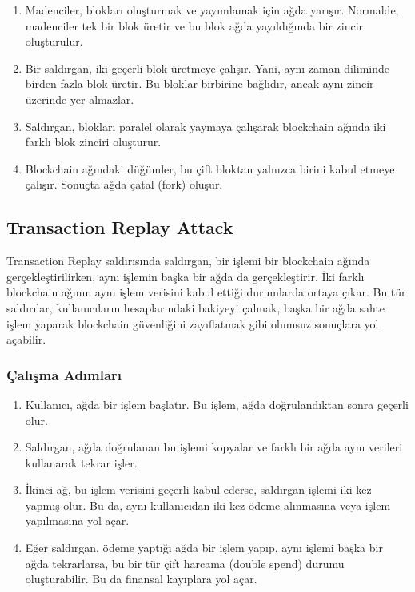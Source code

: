 \begin{enumerate}
    \item Madenciler, blokları oluşturmak ve yayımlamak için ağda yarışır. Normalde, madenciler tek bir blok üretir ve bu blok ağda yayıldığında bir zincir oluşturulur.
    \item Bir saldırgan, iki geçerli blok üretmeye çalışır. Yani, aynı zaman diliminde birden fazla blok üretir. Bu bloklar birbirine bağlıdır, ancak aynı zincir üzerinde yer almazlar.
    \item Saldırgan, blokları paralel olarak yaymaya çalışarak blockchain ağında iki farklı blok zinciri oluşturur.
    \item Blockchain ağındaki düğümler, bu çift bloktan yalnızca birini kabul etmeye çalışır. Sonuçta ağda çatal (fork) oluşur.
\end{enumerate}

\newpage

\subsection{Transaction Replay Attack}

Transaction Replay saldırısında saldırgan, bir işlemi bir blockchain ağında gerçekleştirilirken, aynı işlemin başka bir ağda da gerçekleştirir. İki farklı blockchain ağının aynı işlem verisini kabul ettiği durumlarda ortaya çıkar. Bu tür saldırılar, kullanıcıların hesaplarındaki bakiyeyi çalmak, başka bir ağda sahte işlem yaparak blockchain güvenliğini zayıflatmak gibi olumsuz sonuçlara yol açabilir.

\subsubsection{Çalışma Adımları}

\begin{enumerate}
    \item Kullanıcı, ağda bir işlem başlatır. Bu işlem, ağda doğrulandıktan sonra geçerli olur.
    \item Saldırgan, ağda doğrulanan bu işlemi kopyalar ve farklı bir ağda aynı verileri kullanarak tekrar işler.
    \item İkinci ağ, bu işlem verisini geçerli kabul ederse, saldırgan işlemi iki kez yapmış olur. Bu da, aynı kullanıcıdan iki kez ödeme alınmasına veya işlem yapılmasına yol açar.
    \item Eğer saldırgan, ödeme yaptığı ağda bir işlem yapıp, aynı işlemi başka bir ağda tekrarlarsa, bu bir tür çift harcama (double spend) durumu oluşturabilir. Bu da finansal kayıplara yol açar.
\end{enumerate}

